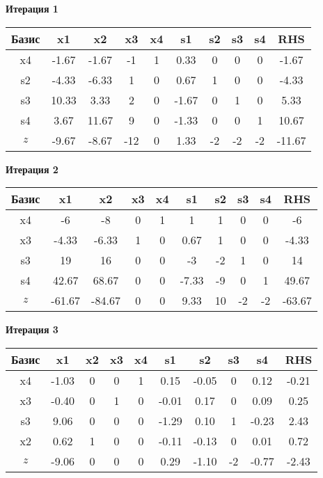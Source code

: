 \documentclass[a4paper,12pt]{article}
\begin{document}
 \textbf{Итерация 1}\\
\begin{tabular}{|c|c|c|c|c|c|c|c|c|c|}
\hline
Базис & x1 & x2 & x3 & x4 & s1 & s2 & s3 & s4 & RHS \\ \hline
x4 & -1.67 & -1.67 & -1 & 1 & 0.33 & 0 & 0 & 0 & -1.67 \\ \hline
s2 & -4.33 & -6.33 & 1 & 0 & 0.67 & 1 & 0 & 0 & -4.33 \\ \hline
s3 & 10.33 & 3.33 & 2 & 0 & -1.67 & 0 & 1 & 0 & 5.33 \\ \hline
s4 & 3.67 & 11.67 & 9 & 0 & -1.33 & 0 & 0 & 1 & 10.67 \\ \hline
$z$ & -9.67 & -8.67 & -12 & 0 & 1.33 & -2 & -2 & -2 & -11.67 \\ \hline
\end{tabular}
\vspace{5mm}

 \textbf{Итерация 2}\\
\begin{tabular}{|c|c|c|c|c|c|c|c|c|c|}
\hline
Базис & x1 & x2 & x3 & x4 & s1 & s2 & s3 & s4 & RHS \\ \hline
x4 & -6 & -8 & 0 & 1 & 1 & 1 & 0 & 0 & -6 \\ \hline
x3 & -4.33 & -6.33 & 1 & 0 & 0.67 & 1 & 0 & 0 & -4.33 \\ \hline
s3 & 19 & 16 & 0 & 0 & -3 & -2 & 1 & 0 & 14 \\ \hline
s4 & 42.67 & 68.67 & 0 & 0 & -7.33 & -9 & 0 & 1 & 49.67 \\ \hline
$z$ & -61.67 & -84.67 & 0 & 0 & 9.33 & 10 & -2 & -2 & -63.67 \\ \hline
\end{tabular}
\vspace{5mm}

 \textbf{Итерация 3}\\
\begin{tabular}{|c|c|c|c|c|c|c|c|c|c|}
\hline
Базис & x1 & x2 & x3 & x4 & s1 & s2 & s3 & s4 & RHS \\ \hline
x4 & -1.03 & 0 & 0 & 1 & 0.15 & -0.05 & 0 & 0.12 & -0.21 \\ \hline
x3 & -0.40 & 0 & 1 & 0 & -0.01 & 0.17 & 0 & 0.09 & 0.25 \\ \hline
s3 & 9.06 & 0 & 0 & 0 & -1.29 & 0.10 & 1 & -0.23 & 2.43 \\ \hline
x2 & 0.62 & 1 & 0 & 0 & -0.11 & -0.13 & 0 & 0.01 & 0.72 \\ \hline
$z$ & -9.06 & 0 & 0 & 0 & 0.29 & -1.10 & -2 & -0.77 & -2.43 \\ \hline
\end{tabular}
\vspace{5mm}
\end{document}
